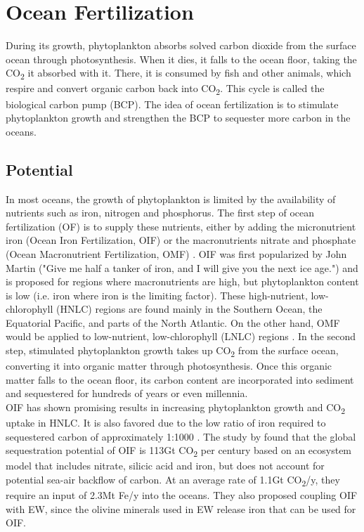 \section{Ocean Fertilization}
During its growth, phytoplankton absorbs solved carbon dioxide from the surface ocean through photosynthesis. When it dies, it falls to the ocean floor, taking the CO\textsubscript{2} it absorbed with it. There, it is consumed by fish and other animals, which respire and convert organic carbon back into CO\textsubscript{2}. This cycle is called the biological carbon pump (BCP). The idea of ocean fertilization is to stimulate phytoplankton growth and strengthen the BCP to sequester more carbon in the oceans.
\subsection*{Potential}
In most oceans, the growth of phytoplankton is limited by the availability of nutrients such as iron, nitrogen and phosphorus. The first step of ocean fertilization (OF) is to supply these nutrients, either by adding the micronutrient iron (Ocean Iron Fertilization, OIF) or the macronutrients nitrate and phosphate (Ocean Macronutrient Fertilization, OMF) \parencite[77]{NAS2022ASequestration}.
OIF was first popularized by John Martin ("Give me half a tanker of iron, and I will give you the next ice age.") and is proposed for regions where macronutrients are high, but phytoplankton content is low (i.e. iron where iron is the limiting factor). These high-nutrient, low-chlorophyll (HNLC) regions are found mainly in the Southern Ocean, the Equatorial Pacific, and parts of the North Atlantic. On the other hand, OMF would be applied to low-nutrient, low-chlorophyll (LNLC) regions \parencite{Chisholm2001Dis-CreditingFertilization}.
In the second step, stimulated phytoplankton growth takes up CO\textsubscript{2} from the surface ocean, converting it into organic matter through photosynthesis. Once this organic matter falls to the ocean floor, its carbon content are incorporated into sediment and sequestered for hundreds of years or even millennia. \parencite{Fuss2018NegativeEffects, S.F.Jones2014TheNourishment}\\
OIF has shown promising results in increasing phytoplankton growth and CO\textsubscript{2} uptake in HNLC. It is also favored due to the low ratio of iron required to sequestered carbon of approximately 1:1000 \parencite[99]{NAS2022ASequestration}.
The study by \textcite{Hauck2016IronExperiment} found that the global sequestration potential of OIF is 113Gt CO\textsubscript{2} per century based on an ecosystem model that includes nitrate, silicic acid and iron, but does not account for potential sea-air backflow of carbon. At an average rate of 1.1Gt CO\textsubscript{2}/y, they require an input of 2.3Mt Fe/y into the oceans. They also proposed coupling OIF with EW, since the olivine minerals used in EW release iron that can be used for OIF.
